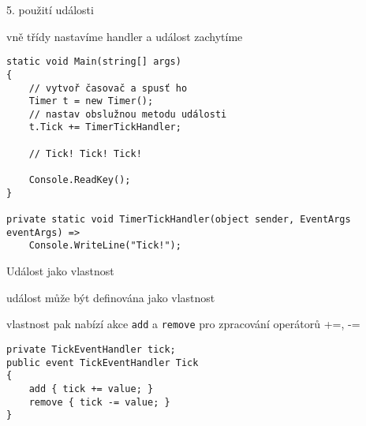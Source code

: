 \begin{frame}[fragile]
\vfill
\begin{bitemize}{5. použití události}
\item vně třídy nastavíme handler a událost zachytíme
\end{bitemize}
\vfill
\begin{yesblock}
\begin{lstlisting}
static void Main(string[] args)
{
	// vytvoř časovač a spusť ho
    Timer t = new Timer();
    // nastav obslužnou metodu události
    t.Tick += TimerTickHandler;

    // Tick! Tick! Tick!

    Console.ReadKey();
}

private static void TimerTickHandler(object sender, EventArgs eventArgs) =>
    Console.WriteLine("Tick!");
\end{lstlisting}
\end{yesblock}
\vfill
\end{frame}





\begin{frame}[fragile]
\vfill
\begin{bitemize}{Událost jako vlastnost}
\item událost může být definována jako vlastnost
\item vlastnost pak nabízí akce \lstinline|add| a \lstinline|remove| pro zpracování operátorů +=, -=
\end{bitemize}
\vfill
\begin{yesblock}
\begin{lstlisting}
private TickEventHandler tick;
public event TickEventHandler Tick
{
    add { tick += value; }
    remove { tick -= value; }
}
\end{lstlisting}
\end{yesblock}
\vfill
\end{frame}
